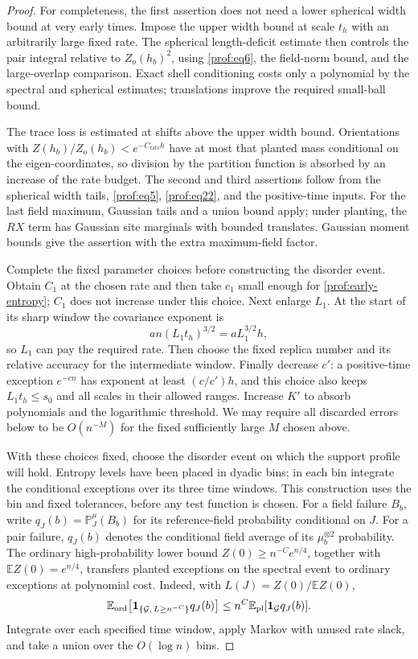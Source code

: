 \begin{proof}
For completeness, the first assertion does not need a lower spherical
width bound at very early times.  Impose the upper width bound at scale
$t_h$ with an arbitrarily large fixed rate.  The spherical length-deficit
estimate then controls the pair integral relative to $Z_o(h_b)^2$, using
\eqref{prof:eq6}, the field-norm bound, and the large-overlap comparison.
Exact shell conditioning costs only a polynomial by the spectral and
spherical estimates; translations improve the required small-ball bound.

The trace loss is estimated at shifts above the upper width bound.
Orientations with $Z(h_b)/Z_o(h_b)<e^{-C_{\mathrm{rate}}h}$ have at most
that planted mass conditional on the eigen-coordinates, so division by the
partition function is absorbed by an increase of the rate budget.  The
second and third assertions follow from the spherical width tails,
\eqref{prof:eq5}, \eqref{prof:eq22}, and the positive-time inputs.  For the
last field maximum, Gaussian tails and a union bound apply; under planting,
the $RX$ term has Gaussian site marginals with bounded translates.  Gaussian
moment bounds give the assertion with the extra maximum-field factor.

Complete the fixed parameter choices before constructing the disorder
event. Obtain \(C_1\) at the chosen rate and then take \(c_1\) small enough
for \eqref{prof:early-entropy}; \(C_1\) does not increase under this choice.
Next enlarge \(L_1\). At the start of its sharp window the covariance
exponent is
\[
 an(L_1t_h)^{3/2}=aL_1^{3/2}h,
\]
so \(L_1\) can pay the required rate. Then choose the fixed replica number
and its relative accuracy for the intermediate window. Finally decrease
\(c'\): a positive-time exception \(e^{-cn}\) has exponent at least
\((c/c')h\), and this choice also keeps \(L_1t_h\le s_0\) and all scales
in their allowed ranges. Increase \(K'\) to absorb polynomials and the
logarithmic threshold. We may require all discarded errors below to be
$O(n^{-M})$ for the fixed sufficiently large $M$ chosen above.

With these choices fixed, choose the disorder event on which the support
profile will hold. Entropy levels have been placed in dyadic bins; in each
bin integrate the conditional exceptions over its three time windows.
This construction uses the bin and fixed tolerances, before any test
function is chosen. For a field failure \(B_b\), write
\(q_J(b)=\mathbb P_J^\mu(B_b)\) for its reference-field probability
conditional on \(J\). For a pair failure, \(q_J(b)\) denotes the
conditional field average of its \(\mu_b^{\otimes2}\) probability.
The ordinary high-probability
lower bound $Z(0)\ge n^{-C}e^{n/4}$, together with
$\mathbb EZ(0)=e^{n/4}$, transfers planted exceptions on the spectral event
to ordinary exceptions at polynomial cost. Indeed, with
\(L(J)=Z(0)/\mathbb EZ(0)\),
\[
 \mathbb E_{\rm ord}\!\left[\mathbf1_{\{\mathcal G,\,L\ge n^{-C}\}}
                    q_J(b)\right]
 \le n^C\mathbb E_{\rm pl}[\mathbf1_{\mathcal G}q_J(b)].
\]
Integrate over each specified time window, apply Markov with unused rate
slack, and take a union over the $O(\log n)$ bins.


\end{proof}
